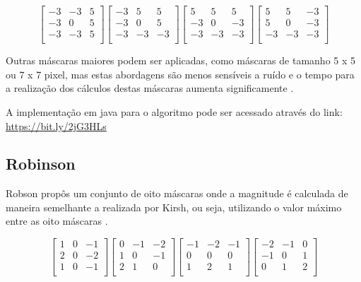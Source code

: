\documentclass[
	12pt,				%
	oneside,			%
	a4paper,			%
	english,			%
	french,				%
	spanish,			%
	brazil,				%
	]{abntex2}
\begin{document}
\[
\begin{bmatrix}
    -3 & -3 &  5   \\ 
	-3 &  0 &  5   \\ 
	-3 & -3 &  5   \\ 
\end{bmatrix} 
\begin{bmatrix}
    -3 &  5 &  5   \\ 
	-3 &  0 &  5   \\ 
	-3 & -3 & -3   \\ 
\end{bmatrix}
\begin{bmatrix}
     5 &  5 &  5   \\ 
	-3 &  0 & -3   \\ 
	-3 & -3 & -3   \\ 
\end{bmatrix} 
\begin{bmatrix}
     5 &  5 & -3   \\ 
	 5 &  0 & -3   \\ 
	-3 & -3 & -3   \\ 
\end{bmatrix}
\]

Outras máscaras maiores podem ser aplicadas, como máscaras de tamanho 5 x 5 ou 7 x 7 pixel, mas estas abordagens são menos sensíveis a ruído e o tempo para a realização dos cálculos destas máscaras aumenta significamente \cite{pedriniSchwartz:2008}.

A implementação em java para o algoritmo pode ser acessado através do link: \url{https://bit.ly/2jG3HLs}

\subsection{Robinson}
Robson propôs um conjunto de oito máscaras onde a magnitude é calculada de maneira semelhante a realizada por Kirsh, ou seja, utilizando o valor máximo entre as oito máscaras \cite{pedriniSchwartz:2008}. 

\[
\begin{bmatrix}
     1 &  0 & -1   \\ 
	 2 &  0 & -2   \\ 
	 1 &  0 & -1   \\ 
\end{bmatrix} 
\begin{bmatrix}
     0 & -1 & -2   \\ 
	 1 &  0 & -1   \\ 
	 2 &  1 &  0   \\ 
\end{bmatrix}
\begin{bmatrix}
    -1 & -2 & -1   \\ 
	 0 &  0 &  0   \\ 
	 1 &  2 &  1   \\ 
\end{bmatrix} 
\begin{bmatrix}
    -2 & -1 &  0   \\ 
	-1 &  0 &  1   \\ 
	 0 &  1 &  2   \\ 
\end{bmatrix}
\]
\end{document}
